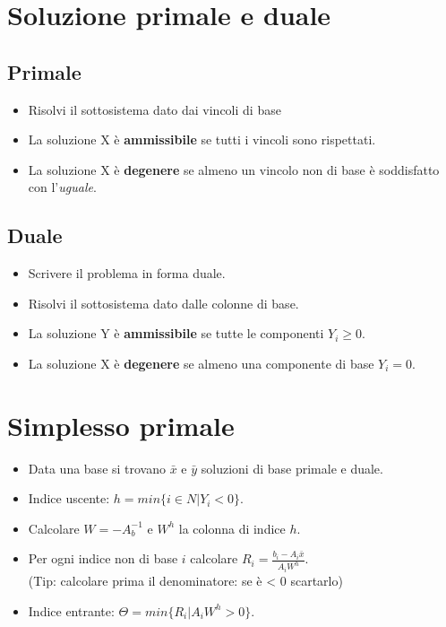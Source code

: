 \documentclass[9pt]{extarticle}
\begin{document}
\begin{multicols}{2}

\section{Soluzione primale e duale}
\subsection{Primale}
\begin{itemize}
    \setlength{\itemsep}{-3pt}
    \item Risolvi il sottosistema dato dai vincoli di base
    \item La soluzione X è \textbf{ammissibile} se tutti i vincoli sono
        rispettati.
    \item La soluzione X è \textbf{degenere} se almeno un vincolo non di base
        è soddisfatto con l'\textit{uguale}.
\end{itemize}
\subsection{Duale}
\begin{itemize}
    \setlength{\itemsep}{-3pt}
    \item Scrivere il problema in forma duale.
    \item Risolvi il sottosistema dato dalle colonne di base.
    \item La soluzione Y è \textbf{ammissibile} se tutte le componenti
        $Y_i \ge 0$.
    \item La soluzione X è \textbf{degenere} se almeno una componente di base
        $Y_i = 0$.
\end{itemize}

\section{Simplesso primale}
\begin{itemize}
    \setlength{\itemsep}{-3pt}
    \item Data una base si trovano $\bar{x}$ e $\bar{y}$ soluzioni di base
        primale e duale.
    \item Indice uscente: $h = min\{i \in N | Y_i < 0 \}$.
    \item Calcolare $W = -A_b^{-1}$ e $W^h$ la colonna di indice $h$.
    \item Per ogni indice non di base $i$ calcolare
        $R_i = \frac{b_i-A_i\bar{x}}{A_iW^h}$.\\
        (Tip: calcolare prima il denominatore: se è < 0 scartarlo)
    \item Indice entrante: $\Theta = min\{R_i | A_iW^h > 0\}$.
\end{itemize}


\end{multicols}
\end{document}
